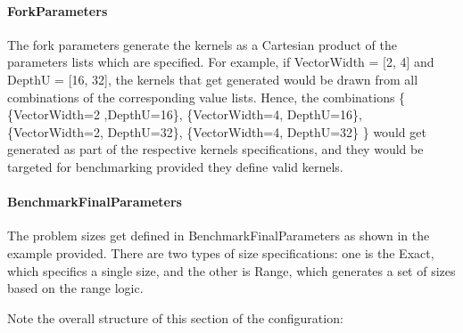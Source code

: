 \documentclass[]{article}
\begin{document}
\label{sec:forkParams}
\paragraph{ForkParameters} The fork parameters generate the kernels as a Cartesian product of the parameters lists which are specified. For example, if VectorWidth = [2, 4] and DepthU = [16, 32], the kernels that get generated would be drawn from all combinations of the corresponding value lists. Hence, the combinations \{ \{VectorWidth=2 ,DepthU=16\}, \{VectorWidth=4, DepthU=16\},  \{VectorWidth=2, DepthU=32\}, \{VectorWidth=4, DepthU=32\} \} would get generated as part of the respective kernels specifications, and they would be targeted for benchmarking provided they define valid kernels.

\paragraph{BenchmarkFinalParameters} The problem sizes get defined in BenchmarkFinalParameters as shown in the example provided. There are two types of size specifications: one is the Exact, which specifics a single size, and the other is Range, which generates a set of sizes based on the range logic.

\hfill \break
Note the overall structure of this section of the configuration:

\hfill \break
{}






\end{document}

